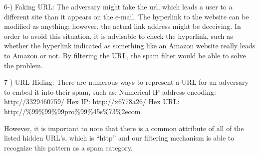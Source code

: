 6-) Faking URL: The adversary might fake the url, which leads a user to a different site than it appears on the e-mail. The hyperlink to the website can be modified as anything; however, the actual link address might be deceiving. In order to avoid this situation, it is advisable to check the hyperlink, such as whether the hyperlink indicated as something like an Amazon website really leads to Amazon or not. By filtering the URL, the spam filter would be able to solve the problem. 

7-) URL Hiding: There are numerous ways to represent a URL for an adversary to embed it into their spam, such as: \newline
Numerical IP address encoding: http://3329460759/ \newline
Hex IP: http://x6778a26/ \newline
Hex URL: http://\%99\%99\%99pro\%99\%45s\%73\%2ecom \newline

However, it is important to note that there is a common attribute of all of the listed hidden URL’s, which is “http” and our filtering mechanism is able to recognize this pattern as a spam category. 



